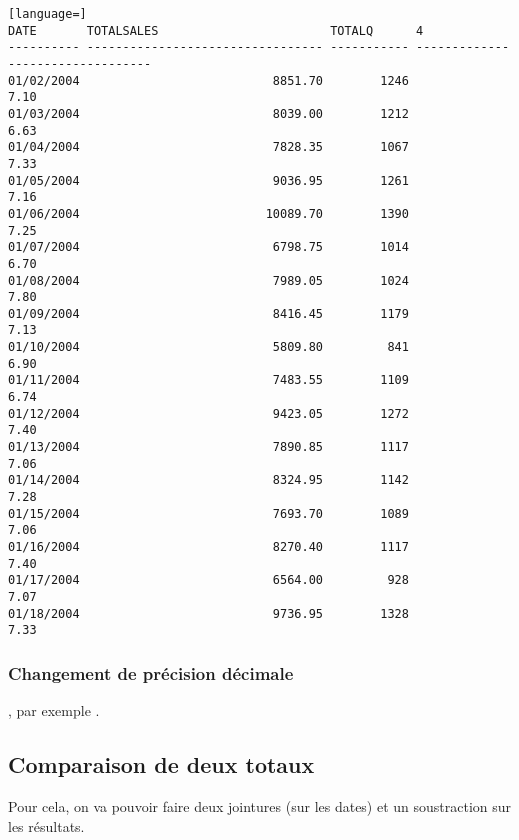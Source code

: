 \begin{lstlisting}[language=]
DATE       TOTALSALES                        TOTALQ      4                                
---------- --------------------------------- ----------- ---------------------------------
01/02/2004                           8851.70        1246                              7.10
01/03/2004                           8039.00        1212                              6.63
01/04/2004                           7828.35        1067                              7.33
01/05/2004                           9036.95        1261                              7.16
01/06/2004                          10089.70        1390                              7.25
01/07/2004                           6798.75        1014                              6.70
01/08/2004                           7989.05        1024                              7.80
01/09/2004                           8416.45        1179                              7.13
01/10/2004                           5809.80         841                              6.90
01/11/2004                           7483.55        1109                              6.74
01/12/2004                           9423.05        1272                              7.40
01/13/2004                           7890.85        1117                              7.06
01/14/2004                           8324.95        1142                              7.28
01/15/2004                           7693.70        1089                              7.06
01/16/2004                           8270.40        1117                              7.40
01/17/2004                           6564.00         928                              7.07
01/18/2004                           9736.95        1328                              7.33
\end{lstlisting}

\subsubsection{Changement de précision décimale}
, par exemple .

\subsection{Comparaison de deux totaux}
Pour cela, on va pouvoir faire deux jointures (sur les dates) et un soustraction sur les résultats.

